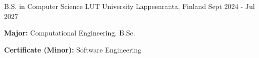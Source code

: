 

\begin{cventries}

  \cventryalt
    {B.S. in Computer Science} %
    {LUT University} %
    {Lappeenranta, Finland} %
    {Sept 2024 - Jul 2027} %
    {
      \begin{cvitems} %
        \item {\textbf{Major:} Computational Engineering, B.Sc.}
        \item {\textbf{Certificate (Minor):} Software Engineering}
      \end{cvitems}
    }
\end{cventries}
\vspace{-3.0mm}